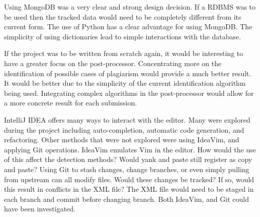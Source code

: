 Using MongoDB was a very clear and strong design decision. If a RDBMS was to be used then the tracked data would need to be completely different from its current form. The use of Python has a clear advantage for using MongoDB. The simplicity of using dictionaries lead to simple interactions with the database.

If the project was to be written from scratch again, it would be interesting to have a greater focus on the post-processor. Concentrating more on the identification of possible cases of plagiarism would provide a much better result. It would be better due to the simplicity of the current identification algorithm being used. Integrating complex algorithms in the post-processor would allow for a more concrete result for each submission.

IntelliJ IDEA offers many ways to interact with the editor. Many were explored during the project including auto-completion, automatic code generation, and refactoring. Other methods that were not explored were using IdeaVim, and applying Git operations. IdeaVim emulates Vim in the editor. How would the use of this affect the detection methods? Would yank and paste still register as copy and paste? Using Git to stash changes, change branches, or even simply pulling from upstream can all modify files. Would these changes be tracked? If so, would this result in conflicts in the XML file? The XML file would need to be staged in each branch and commit before changing branch. Both IdeaVim, and Git could have been investigated.
